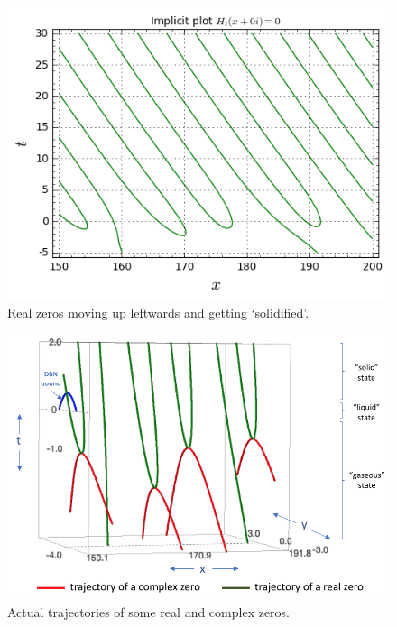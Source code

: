 \begin{remark}
\begin{figure}[h!]
  \includegraphics[width=0.9\linewidth]{real_zeros_solid.png}
  \caption{Real zeros moving up leftwards and getting `solidified'.}
\end{figure}

\begin{figure}[h!]
  \includegraphics[width=0.9\linewidth]{Actual_trajectories_zeros.png}
  \caption{Actual trajectories of some real and complex zeros.}
\end{figure}

\end{remark}


